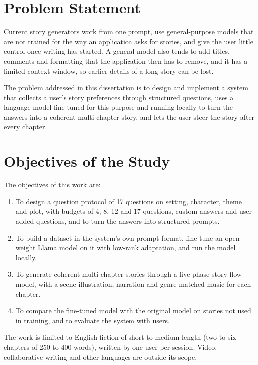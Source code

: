 \section{Problem Statement}
\label{sec:intro-problem}

Current story generators work from one prompt, use general-purpose models that are not trained for the way an application asks for stories, and give the user little control once writing has started. A general model also tends to add titles, comments and formatting that the application then has to remove, and it has a limited context window, so earlier details of a long story can be lost.

The problem addressed in this dissertation is to design and implement a system that collects a user's story preferences through structured questions, uses a language model fine-tuned for this purpose and running locally to turn the answers into a coherent multi-chapter story, and lets the user steer the story after every chapter.

\section{Objectives of the Study}
\label{sec:intro-objectives}

The objectives of this work are:

\begin{enumerate}
    \item To design a question protocol of 17 questions on setting, character, theme and plot, with budgets of 4, 8, 12 and 17 questions, custom answers and user-added questions, and to turn the answers into structured prompts.
    \item To build a dataset in the system's own prompt format, fine-tune an open-weight Llama model on it with low-rank adaptation, and run the model locally.
    \item To generate coherent multi-chapter stories through a five-phase story-flow model, with a scene illustration, narration and genre-matched music for each chapter.
    \item To compare the fine-tuned model with the original model on stories not used in training, and to evaluate the system with users.
\end{enumerate}

The work is limited to English fiction of short to medium length (two to six chapters of 250 to 400 words), written by one user per session. Video, collaborative writing and other languages are outside its scope.

